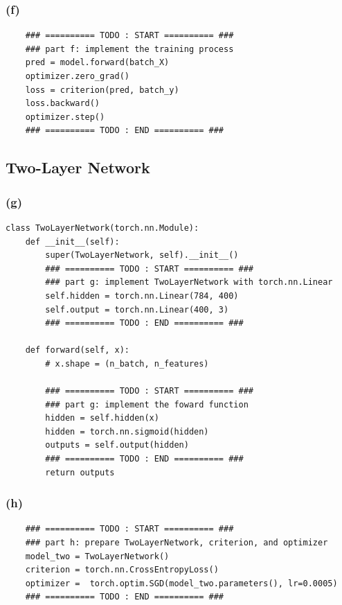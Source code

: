 \documentclass[11pt]{article}
\newcommand{\sol}[1]{{\bf{\color{magenta}{{Solution:}}}}}
\begin{document}
\subsubsection*{(f)}
\sol x 
\begin{lstlisting}
    ### ========== TODO : START ========== ###
    ### part f: implement the training process
    pred = model.forward(batch_X)
    optimizer.zero_grad()
    loss = criterion(pred, batch_y)
    loss.backward()
    optimizer.step()
    ### ========== TODO : END ========== ###
\end{lstlisting}

\subsection{Two-Layer Network}

\subsubsection*{(g)}
\sol x 
\begin{lstlisting}
class TwoLayerNetwork(torch.nn.Module):
    def __init__(self):
        super(TwoLayerNetwork, self).__init__()
        ### ========== TODO : START ========== ###
        ### part g: implement TwoLayerNetwork with torch.nn.Linear
        self.hidden = torch.nn.Linear(784, 400)
        self.output = torch.nn.Linear(400, 3)
        ### ========== TODO : END ========== ###

    def forward(self, x):
        # x.shape = (n_batch, n_features)

        ### ========== TODO : START ========== ###
        ### part g: implement the foward function
        hidden = self.hidden(x)
        hidden = torch.nn.sigmoid(hidden)
        outputs = self.output(hidden)
        ### ========== TODO : END ========== ###
        return outputs
\end{lstlisting}

\subsubsection*{(h)}
\sol x 
\begin{lstlisting}
    ### ========== TODO : START ========== ###
    ### part h: prepare TwoLayerNetwork, criterion, and optimizer
    model_two = TwoLayerNetwork()
    criterion = torch.nn.CrossEntropyLoss()
    optimizer =  torch.optim.SGD(model_two.parameters(), lr=0.0005)
    ### ========== TODO : END ========== ###
\end{lstlisting}
\end{document}
